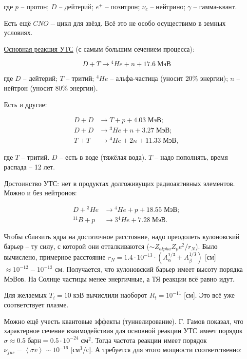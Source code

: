 \documentclass[10pt, a4paper]{article}
\begin{document}
где $p$ -- протон; $D$ -- дейтерий; $e^{+}$ -- позитрон; $\nu_e$ -- нейтрино; $\gamma$ -- гамма-квант.

Есть ещё $CNO-$цикл для звёзд. Всё это не особо осуществимо в земных условиях.

\uline{Основная реакция УТС} (с самым большим сечением процесса):

\begin{equation*}
	D + T \rightarrow {}^4He + n + 17.6\;\text{МэВ}
\end{equation*}

где $D$ -- дейтерий; $T$ -- тритий; ${}^4He$ -- альфа-частица (уносит $20\%$ энергии); $n$ -- нейтрон (уносит $80\%$ энергии).

Есть и другие:

\begin{align*}
	D + D &\rightarrow T + p + 4.03\;\text{МэВ}; \\
	D + D &\rightarrow {}^3He + n + 3.27\;\text{МэВ}; \\
	T + T &\rightarrow {}^4He + 2n + 11.33\;\text{МэВ},
\end{align*}

где $T$ -- тритий. $D$ -- есть в воде (тяжёлая вода). $T$ -- надо пополнять, время распада -- 12 лет.

Достоинство УТС: нет в продуктах долгоживущих радиоактивных элементов. Можно и без нейтронов:

\begin{align*}
	D + {}^3He &\rightarrow {}^4He + p + 18.55\;\text{МэВ}; \\
	{}^{11}B + p &\rightarrow 3{}^4He + 7.28\;\text{МэВ}.
\end{align*}

Чтобы сблизить ядра на достаточное расстояние, надо преодолеть кулоновский барьер -- ту силу, с которой они отталкиваются ($\sim Z_{alpha}Z_p e^2/r_N$). Было вычислено, примерное расстояние $r_N = 1.4\cdot10^{-13}\cdot (A_\alpha^{1/3}+A_\beta^{1/3})$ [см] $\approx 10^{-12}-10^{-13}$ см. Получается, что кулоновский барьер имеет высоту порядка МэВов. На Солнце частицы менее энергичные, а ТЯ реакции всё равно идут.

Для желаемых $T_i = 10$ кэВ вычислили наоборот $R_t = 10^{-11}$ [см]. Это всё уже соответствует плазме.

Можно ещё учесть квантовые эффекты (туннелирование). Г. Гамов показал, что характерное сечение взаимодействия для основной реакции УТС имеет порядок $\sigma\approx 0.5\;\text{барн}=0.5\cdot 10^{-24}$ см$^2$. Тогда частота реакции имеет порядок $\nu_{fus} = \left\langle\sigma v\right\rangle\sim 10^{-16}$ [см$^3$/с]. А требуется для этого мощности соответственно:
\end{document}
